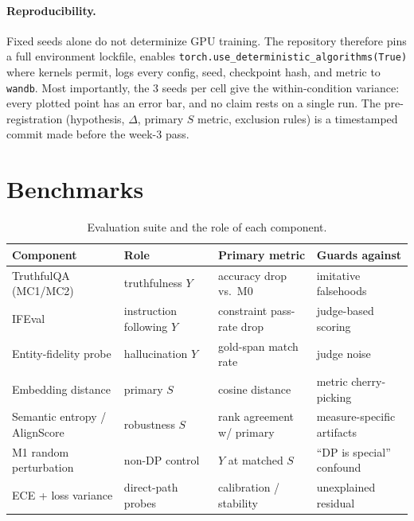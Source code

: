 \documentclass{article}
\theoremstyle{definition}
\theoremstyle{plain}
\theoremstyle{remark}
\newcommand{\Sdist}{S}
\newcommand{\seclabel}[1]{\label{sec:#1}}
\begin{document}
\paragraph{Reproducibility.}
Fixed seeds alone do not determinize GPU training. The repository therefore
pins a full environment lockfile,
enables \texttt{torch.use\_deterministic\_algorithms(True)} where kernels
permit, logs every config, seed, checkpoint hash, and metric to
\texttt{wandb}. Most importantly, the $3$ seeds per cell give the
within-condition variance: every plotted point has an error bar, and no claim
rests on a single run. The pre-registration (hypothesis,
$\Delta$, primary $\Sdist$ metric, exclusion rules) is a timestamped commit
made before the week-3 pass.

\section{Benchmarks}\seclabel{benchmarks}
\begin{table}[h]
\centering\small
\begin{tabular}{@{}llll@{}}
\toprule
Component & Role & Primary metric & Guards against \\
\midrule
TruthfulQA (MC1/MC2) & truthfulness $Y$ & accuracy drop vs.\ M0 & imitative falsehoods \\
IFEval & instruction following $Y$ & constraint pass-rate drop & judge-based scoring \\
Entity-fidelity probe & hallucination $Y$ & gold-span match rate & judge noise \\
Embedding distance & primary $\Sdist$ & cosine distance & metric cherry-picking \\
Semantic entropy / AlignScore & robustness $\Sdist$ & rank agreement w/ primary & measure-specific artifacts \\
M1 random perturbation & non-DP control & $Y$ at matched $\Sdist$ & ``DP is special'' confound \\
ECE + loss variance & direct-path probes & calibration / stability & unexplained residual \\
\bottomrule
\end{tabular}
\caption{Evaluation suite and the role of each component.}
\label{tab:bench}
\end{table}
\end{document}
